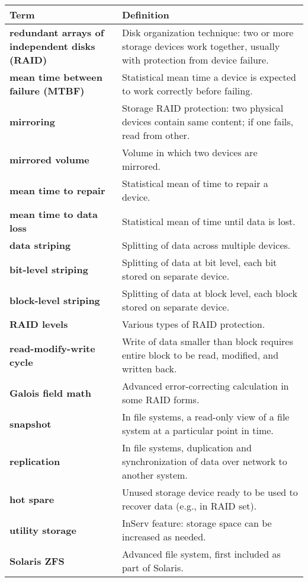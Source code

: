 \vspace{1em}
\begin{tabular}{p{}p{}}
\toprule
\rowcolor{lightgray} \textbf{Term} & \textbf{Definition} \\
\midrule
\textbf{redundant arrays of independent disks (RAID)} & Disk organization technique: two or more storage devices work together, usually with protection from device failure. \\
\textbf{mean time between failure (MTBF)} & Statistical mean time a device is expected to work correctly before failing. \\
\textbf{mirroring} & Storage RAID protection: two physical devices contain same content; if one fails, read from other. \\
\textbf{mirrored volume} & Volume in which two devices are mirrored. \\
\textbf{mean time to repair} & Statistical mean of time to repair a device. \\
\textbf{mean time to data loss} & Statistical mean of time until data is lost. \\
\textbf{data striping} & Splitting of data across multiple devices. \\
\textbf{bit-level striping} & Splitting of data at bit level, each bit stored on separate device. \\
\textbf{block-level striping} & Splitting of data at block level, each block stored on separate device. \\
\textbf{RAID levels} & Various types of RAID protection. \\
\textbf{read-modify-write cycle} & Write of data smaller than block requires entire block to be read, modified, and written back. \\
\textbf{Galois field math} & Advanced error-correcting calculation in some RAID forms. \\
\textbf{snapshot} & In file systems, a read-only view of a file system at a particular point in time. \\
\textbf{replication} & In file systems, duplication and synchronization of data over network to another system. \\
\textbf{hot spare} & Unused storage device ready to be used to recover data (e.g., in RAID set). \\
\textbf{utility storage} & InServ feature: storage space can be increased as needed. \\
\textbf{Solaris ZFS} & Advanced file system, first included as part of Solaris. \\

\end{tabular}
